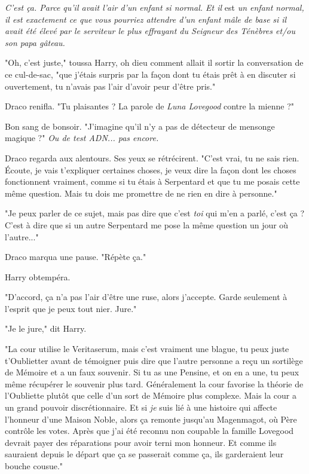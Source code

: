 \emph{C'est ça. Parce qu'il avait l'air d'un enfant si normal. Et il } est\emph{ un enfant normal, il est exactement ce que vous pourriez attendre d'un enfant mâle de base } \emph{si il avait été élevé par le serviteur le plus effrayant du Seigneur des Ténèbres et/ou son papa gâteau.} 

"Oh, c'est juste," toussa Harry, oh dieu comment allait il sortir la conversation de ce cul-de-sac, "que j'étais surpris par la façon dont tu étais prêt à en discuter si ouvertement, tu n'avais pas l'air d'avoir peur d'être pris."

Draco renifla. "Tu plaisantes ? La parole de \emph{Luna Lovegood}  contre la mienne ?"

Bon sang de bonsoir. "J'imagine qu'il n'y a pas de détecteur de mensonge magique ?" \emph{Ou de test ADN... pas encore.} 

Draco regarda aux alentours. Ses yeux se rétrécirent. "C'est vrai, tu ne sais rien. Écoute, je vais t'expliquer certaines choses, je veux dire la façon dont les choses fonctionnent vraiment, comme si tu étais à Serpentard et que tu me posais cette même question. Mais tu dois me promettre de ne rien en dire à personne."

"Je peux parler de ce sujet, mais pas dire que c'est \emph{toi}  qui m'en a parlé, c'est ça ? C'est à dire que si un autre Serpentard me pose la même question un jour où l'autre..."

Draco marqua une pause. "Répète ça."

Harry obtempéra.

"D'accord, ça n'a pas l'air d'être une ruse, alors j'accepte. Garde seulement à l'esprit que je peux tout nier. Jure."

"Je le jure," dit Harry.

"La cour utilise le Veritaserum, mais c'est vraiment une blague, tu peux juste t'Oublietter avant de témoigner puis dire que l'autre personne a reçu un sortilège de Mémoire et a un faux souvenir. Si tu as une Pensine, et on en a une, tu peux même récupérer le souvenir plus tard. Généralement la cour favorise la théorie de l'Oubliette plutôt que celle d'un sort de Mémoire plus complexe. Mais la cour a un grand pouvoir discrétionnaire. Et si \emph{je } suis lié à une histoire qui affecte l'honneur d'une Maison Noble, alors ça remonte jusqu'au Magenmagot, où Père contrôle les votes. Après que j'ai été reconnu non coupable la famille Lovegood devrait payer des réparations pour avoir terni mon honneur. Et comme ils sauraient depuis le départ que ça se passerait comme ça, ils garderaient leur bouche cousue."

